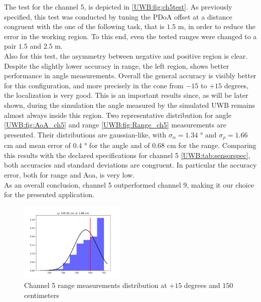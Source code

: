 The test for the channel 5, is depicted in \autoref{UWB:fig:ch5test}. As previously specified, this test was conducted by tuning the PDoA offset at a distance congruent with the one of the following task, that is $1.5$ m, in order to reduce the error in the working region. To this end, even the tested ranges were changed to a pair $1.5$ and $2.5$ m.\\
Also for this test, the asymmetry between negative and positive region is clear. Despite the slightly lower accuracy in range, the left region, shows better performance in angle measurements. Overall the general accuracy is visibly better for this configuration, and more precisely in the cone from $-15$ to $+15$ degrees, the localization is very good. This is an important results since, as will be later shown, during the simulation the angle measured by the simulated UWB remains almost always inside this region. Two representative distribution for angle \autoref{UWB:fig:AoA_ch5} and range \autoref{UWB:fig:Range_ch5} measurements are presented. Their distributions are gaussian-like, with $\sigma_{\alpha} = 1.34$ ° and $\sigma_{\rho} = 1.66$ cm and mean error of $0.4$ ° for the angle and of $0.68$ cm for the range. Comparing this results with the declared specifications for channel 5 \autoref{UWB:tab:sensorspec}, both accuracies and standard deviations are congruent. In particular the accuracy error, both for range and Aoa, is very low.\\
As an overall conclusion, channel 5 outperformed channel 9, making it our choice for the presented application.\\

\begin{figure}
    \centering
    \includegraphics[width=0.45\textwidth]{images/characterization/ch5_range_hist.png}
    \caption{Channel 5 range measurements distribution at $+15$ degrees and $150$ centimeters}
    \label{UWB:fig:Range_ch5}
\end{figure}


